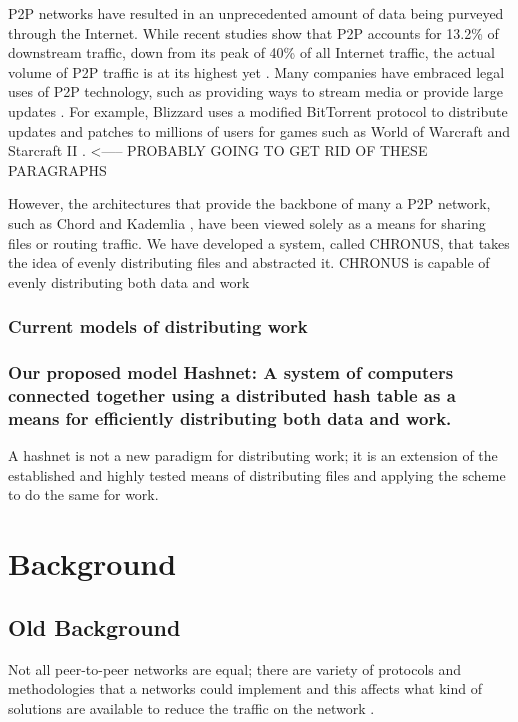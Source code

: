 \documentclass[conference, compsocconf, letterpaper]{IEEEtran}
\begin{document}
P2P networks have resulted in an unprecedented amount of data being purveyed through the Internet.  While recent studies show that P2P accounts for 13.2\% of downstream traffic, down from its peak of 40\% of all Internet traffic, the actual volume of P2P traffic is at its highest yet \cite{5713296}. Many companies have embraced legal uses of P2P technology, such as providing ways to stream media or provide large updates  \cite{P2PLegal}.  For example, Blizzard uses a modified BitTorrent protocol to distribute updates and patches to millions of users for games such as World of Warcraft and Starcraft II \cite{chehai2006analysis}.  <----- PROBABLY GOING TO GET RID OF THESE PARAGRAPHS


However, the architectures that provide the backbone of many a P2P network, such as Chord \cite{Chord} and Kademlia \cite{Kademlia}, have been viewed solely as a means for sharing files  or routing traffic.  We have developed a system, called CHRONUS, that takes the idea of evenly distributing files and abstracted it.  CHRONUS is capable of evenly distributing both data and work 






\subsubsection{Current models of distributing work}

\subsubsection{Our proposed model Hashnet:  A system of computers connected together using a distributed hash table as a means for efficiently distributing both data and work.}

A hashnet is not a new paradigm for distributing work; it is an extension of the established and highly tested means of distributing files and applying the scheme to do the same for work.



\section{Background}


\subsection{Old Background}
Not all peer-to-peer networks are equal; there are variety of protocols and methodologies that a networks could implement and this affects what kind of solutions are available to reduce the traffic on the network    \cite{SurveyCompare} \cite{Overview}.
\end{document}
